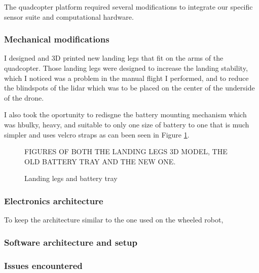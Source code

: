 \documentclass[11pt]{article}
\begin{document}
                The quadcopter platform required several modifications to integrate our specific sensor suite and computational hardware.

                \subsubsection{Mechanical modifications}

                    I designed and 3D printed new landing legs that fit on the arms of the quadcopter. Those landing legs were designed to increase the landing stability, which I noticed was a problem in the manual flight I performed, and to reduce the blindspots of the lidar which was to be placed on the center of the underside of the drone.

                    I also took the oportunity to redisgne the battery mounting mechanism which was hbulky, heavy, and suitable to only one size of battery to one that is much simpler and uses velcro straps as can been seen in Figure \ref{fig:landing_legs}.
                    

                    \begin{figure}[H]
                        \centering
                        FIGURES OF BOTH THE LANDING LEGS 3D MODEL, THE OLD BATTERY TRAY AND THE NEW ONE.
                        \caption{Landing legs and battery tray}
                        \label{fig:landing_legs}
                    \end{figure}    
                \subsubsection{Electronics architecture}
    

                    To keep the architecture similar to the one used on the wheeled robot, 

                \subsubsection{Software architecture and setup}
    
            
                \subsubsection{Issues encountered}
                
\end{document}

